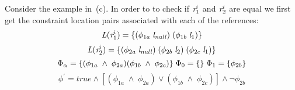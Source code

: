 Consider the example in~(c). In order to to check
if $\emph{r}_1^i$ and $\emph{r}_2^i$ are equal we first get the constraint location
pairs associated with each of the references:
\[
\emph{L}(\emph{r}_1^i) = \{ (\phi_{1a}\; \emph{l}_\mathit{null})\; (\phi_{1b}\; \emph{l}_1) \} 
\]
\[
\emph{L}(\emph{r}_2^i) = \{ (\phi_{2a}\; \emph{l}_\mathit{null})\; (\phi_{2b}\; \emph{l}_2)\; (\phi_{2c}\; \emph{l}_1) \} \\
\]
\[
\Phi_\alpha = \{ (\phi_{1a}\; \wedge\; \phi_{2a} ) (\phi_{1b}\; \wedge\; \phi_{2c} ) \}\;
\Phi_0 = \{ \}\; \Phi_1 = \{ \phi_{2b}\} \\
\]
\[
\phi^\prime = \mathit{true} \wedge [ (\phi_{1a}\; \wedge\; \phi_{2a} )\vee (\phi_{1b}\; \wedge\; \phi_{2c} ) ] \wedge \neg\phi_{2b} 
\]





